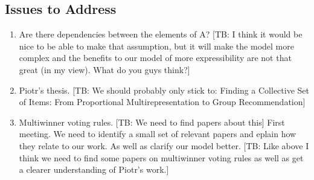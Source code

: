 \documentclass[10pt,a4paper, english]{article}
\newcommand{\haukur}[1]{\textcolor[rgb]{.8,.33,.0}{[TB: #1]}}%
\begin{document}
\begin{enumerate}
\section{Issues to Address}
\begin{enumerate}
\item Are there dependencies between the elements of A? \haukur{I think it would be nice to be able to make that assumption, but it will make the model more complex and the benefits to our model of more expressibility are not that great (in my view). What do you guys think?}
\item Piotr's thesis. \haukur{We should probably only stick to: Finding a Collective Set of Items: From Proportional Multirepresentation to Group Recommendation}
\item Multiwinner voting rules. \haukur{We need to find papers about this}
\Item First meeting. We need to identify a small set of relevant papers and eplain how they relate to our work. As well as clarify our model better. \haukur{Like above I think we need to find some papers on multiwinner voting rules as well as get a clearer understanding of Piotr's work.}
\end{enumerate}

\end{enumerate}
\end{document}
